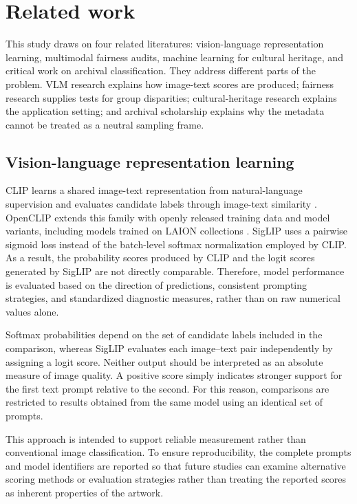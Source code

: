 \documentclass[pdflatex,sn-basic,Numbered]{sn-jnl}
\begin{document}
\section{Related work}
\label{sec:related}

This study draws on four related literatures: vision-language representation learning, multimodal fairness audits, machine learning for cultural heritage, and critical work on archival classification. They address different parts of the problem. VLM research explains how image-text scores are produced; fairness research supplies tests for group disparities; cultural-heritage research explains the application setting; and archival scholarship explains why the metadata cannot be treated as a neutral sampling frame.

\subsection{Vision-language representation learning}

CLIP learns a shared image-text representation from natural-language supervision and evaluates candidate labels through image-text similarity \cite{radford2021learning}. OpenCLIP extends this family with openly released training data and model variants, including models trained on LAION collections \cite{cherti2023reproducible, schuhmann2022laion}.
SigLIP uses a pairwise sigmoid loss instead of the batch-level softmax normalization employed by CLIP. As a result, the probability scores produced by CLIP and the logit scores generated by SigLIP are not directly comparable. Therefore, model performance is evaluated based on the direction of predictions, consistent prompting strategies, and standardized diagnostic measures, rather than on raw numerical values alone.

Softmax probabilities depend on the set of candidate labels included in the comparison, whereas SigLIP evaluates each image–text pair independently by assigning a logit score. Neither output should be interpreted as an absolute measure of image quality. A positive score simply indicates stronger support for the first text prompt relative to the second. For this reason, comparisons are restricted to results obtained from the same model using an identical set of prompts.

This approach is intended to support reliable measurement rather than conventional image classification. To ensure reproducibility, the complete prompts and model identifiers are reported so that future studies can examine alternative scoring methods or evaluation strategies rather than treating the reported scores as inherent properties of the artwork.
\end{document}
